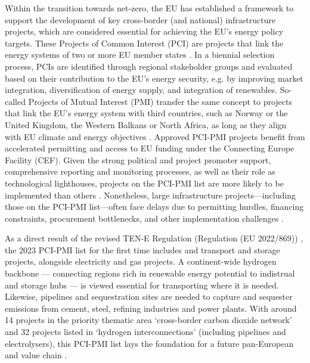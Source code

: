 \documentclass[preprint,12pt,sort&compress]{elsarticle}
\begin{document}
Within the transition towards net-zero, the EU has established a framework to support the development of key cross-border (and national) infrastructure projects, which are considered essential for achieving the EU's energy policy targets. These Projects of Common Interest (PCI) are projects that link the energy systems of two or more EU member states \cite{europeancommissionRegulationEUNo2022}. In a biennial selection process, PCIs are identified through regional stakeholder groups and evaluated based on their contribution to the EU's energy security, e.g. by improving market integration, diversification of energy supply, and integration of renewables. So-called Projects of Mutual Interest (PMI) transfer the same concept to projects that link the EU's energy system with third countries, such as Norway or the United Kingdom, the Western Balkans or North Africa, as long as they align with EU climate and energy objectives \cite{europeancommissionCommissionDelegatedRegulation2023}. Approved PCI-PMI projects benefit from accelerated permitting and access to EU funding under the Connecting Europe Facility (CEF). Given the strong political and project promoter support, comprehensive reporting and monitoring processes, as well as their role as technological lighthouses, projects on the PCI-PMI list are more likely to be implemented than others \cite{europeancommission.directorategeneralforenergy.InvestmentNeedsEuropean2025}. Nonetheless, large infrastructure projects—including those on the PCI-PMI list—often face delays due to permitting hurdles, financing constraints, procurement bottlenecks, and other implementation challenges \cite{acerConsolidatedReportProgress2023}. 

As a direct result of the revised TEN-E Regulation (Regulation (EU 2022/869)) \cite{europeanparliamentRegulationEU20222022}, the 2023 PCI-PMI list \cite{europeancommissionCommissionDelegatedRegulation2023,europeancommissionPCIPMITransparencyPlatform2024} for the first time includes  and  transport and storage projects, alongside electricity and gas projects. A continent-wide hydrogen backbone --- connecting regions rich in renewable energy potential to indistrual and storage hubs --- is viewed essential for transporting  where it is needed. Likewise,  pipelines and sequestration sites are needed to capture and sequester emissions from cement, steel, refining industries and power plants. With around 14 projects in the priority thematic area `cross-border carbon dioxide network' and 32 projects listed in `hydrogen interconnections' (including pipelines and electrolysers), this PCI-PMI list lays the foundation for a future pan-European  and  value chain \cite{europeancommissionAnnexFirstUnion2023}.
\end{document}
